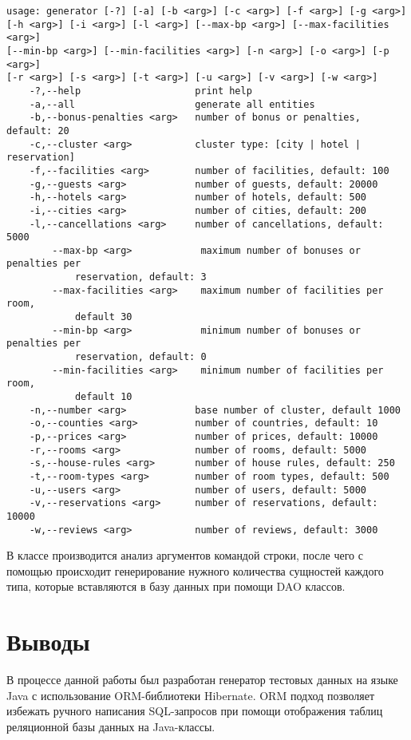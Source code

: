 \begin{lstlisting}[basicstyle=\ttfamily\footnotesize, deletekeywords={default}]
usage: generator [-?] [-a] [-b <arg>] [-c <arg>] [-f <arg>] [-g <arg>] 
[-h <arg>] [-i <arg>] [-l <arg>] [--max-bp <arg>] [--max-facilities <arg>] 
[--min-bp <arg>] [--min-facilities <arg>] [-n <arg>] [-o <arg>] [-p <arg>] 
[-r <arg>] [-s <arg>] [-t <arg>] [-u <arg>] [-v <arg>] [-w <arg>]
	-?,--help                    print help
	-a,--all                     generate all entities
	-b,--bonus-penalties <arg>   number of bonus or penalties, default: 20
	-c,--cluster <arg>           cluster type: [city | hotel | reservation]
	-f,--facilities <arg>        number of facilities, default: 100
	-g,--guests <arg>            number of guests, default: 20000
	-h,--hotels <arg>            number of hotels, default: 500
	-i,--cities <arg>            number of cities, default: 200
	-l,--cancellations <arg>     number of cancellations, default: 5000
		--max-bp <arg>            maximum number of bonuses or penalties per
			reservation, default: 3
		--max-facilities <arg>    maximum number of facilities per room,
			default 30
		--min-bp <arg>            minimum number of bonuses or penalties per
			reservation, default: 0
		--min-facilities <arg>    minimum number of facilities per room,
			default 10
	-n,--number <arg>            base number of cluster, default 1000
	-o,--counties <arg>          number of countries, default: 10
	-p,--prices <arg>            number of prices, default: 10000
	-r,--rooms <arg>             number of rooms, default: 5000
	-s,--house-rules <arg>       number of house rules, default: 250
	-t,--room-types <arg>        number of room types, default: 500
	-u,--users <arg>             number of users, default: 5000
	-v,--reservations <arg>      number of reservations, default: 10000
	-w,--reviews <arg>           number of reviews, default: 3000
\end{lstlisting}

В классе  производится анализ аргументов командой строки, после чего с помощью  происходит генерирование нужного количества сущностей каждого типа, которые вставляются в базу данных при помощи DAO классов.

\section{Выводы}

В процессе данной работы был разработан генератор тестовых данных на языке Java с использование ORM-библиотеки Hibernate. ORM подход позволяет избежать ручного написания SQL-запросов при помощи отображения таблиц реляционной базы данных на Java-классы.


